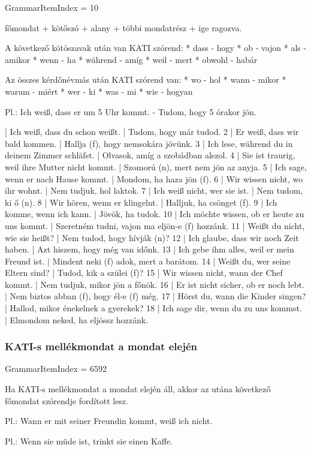 \documentclass{article}
\newenvironment{desc}{\verbatim}{\endverbatim}
\newenvironment{exmp}{\verbatim}{\endverbatim}
\begin{document}
GrammarItemIndex = 10

\begin{desc}
főmondat + kötőszó + alany + többi mondatrész + ige ragozva.

A következő kötöszavak után van KATI szórend:
* dass - hogy
* ob - vajon
* als - amikor
* wenn - ha
* während - amíg
* weil - mert
* obwohl - habár

Az összes kérdőnévmás után KATI szórend van:
* wo - hol
* wann - mikor
* warum - miért
* wer - ki
* was - mi
* wie - hogyan

Pl.: Ich weiß, dass er um 5 Uhr kommt. - Tudom, hogy 5 órakor jön.
\end{desc}

\begin{exmp}
1 | Ich weiß, dass du schon weißt. | Tudom, hogy már tudod.
2 | Er weiß, dass wir bald kommen. | Hallja (f), hogy nemsokára jövünk.
3 | Ich lese, während du in deinem Zimmer schläfst. | Olvasok, amíg a szobádban alszol.
4 | Sie ist traurig, weil ihre Mutter nicht kommt. | Szomorú (n), mert nem jön az anyja.
5 | Ich sage, wenn er nach Hause kommt. | Mondom, ha haza jön (f).
6 | Wir wissen nicht, wo ihr wohnt. | Nem tudjuk, hol laktok.
7 | Ich weiß nicht, wer sie ist. | Nem tudom, ki ő (n).
8 | Wir hören, wenn er klingelnt. | Halljuk, ha csönget (f).
9 | Ich komme, wenn ich kann. | Jövök, ha tudok.
10 | Ich möchte wissen, ob er heute zu uns kommt. | Szeretném tudni, vajon ma eljön-e (f) hozzánk.
11 | Weißt du nicht, wie sie heißt? | Nem tudod, hogy hívják (n)?
12 | Ich glaube, dass wir noch Zeit haben. | Azt hiszem, hogy még van időnk.
13 | Ich gebe ihm alles, weil er mein Freund ist. | Mindent neki (f) adok, mert a barátom.
14 | Weißt du, wer seine Eltern sind? | Tudod, kik a szülei (f)?
15 | Wir wissen nicht, wann der Chef kommt. | Nem tudjuk, mikor jön a főnök.
16 | Er ist nicht sicher, ob er noch lebt. | Nem biztos abban (f), hogy él-e (f) még.
17 | Hörst du, wann die Kinder singen? | Hallod, mikor énekelnek a gyerekek?
18 | Ich sage dir, wenn du zu uns kommst. | Elmondom neked, ha eljössz hozzánk.
\end{exmp}

\subsubsection{KATI-s mellékmondat a mondat elején}

GrammarItemIndex = 6592

\begin{desc}
Ha KATI-s mellékmondat a mondat elején áll, akkor az utána következő főmondat szórendje fordított lesz.

Pl.: Wann er mit seiner Freundin kommt, weiß ich nicht.

Pl.: Wenn sie müde ist, trinkt sie einen Kaffe.
\end{desc}
\end{document}
